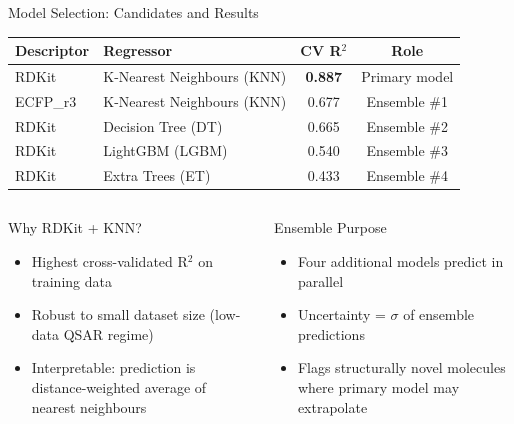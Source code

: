 \documentclass[aspectratio=169]{beamer}
\begin{document}
\begin{frame}{Model Selection: Candidates and Results}
  \centering
  \small
  \begin{tabular}{llcc}
    \toprule
    \textbf{Descriptor} & \textbf{Regressor} & \textbf{CV R$^2$} & \textbf{Role} \\
    \midrule
    \rowcolor{lightgreen}
    RDKit              & K-Nearest Neighbours (KNN)   & \textbf{0.887} & Primary model \\
    ECFP\_r3           & K-Nearest Neighbours (KNN)   & 0.677          & Ensemble \#1 \\
    RDKit              & Decision Tree (DT)           & 0.665          & Ensemble \#2 \\
    RDKit              & LightGBM (LGBM)              & 0.540          & Ensemble \#3 \\
    RDKit              & Extra Trees (ET)             & 0.433          & Ensemble \#4 \\
    \bottomrule
  \end{tabular}
  \vspace{0.8em}

  \begin{columns}
    \begin{block}{Why RDKit + KNN?}
      \small
      \begin{itemize}
        \item Highest cross-validated R$^2$ on training data
        \item Robust to small dataset size (low-data QSAR regime)
        \item Interpretable: prediction is distance-weighted average of nearest neighbours
      \end{itemize}
    \end{block}
    \begin{block}{Ensemble Purpose}
      \small
      \begin{itemize}
        \item Four additional models predict in parallel
        \item Uncertainty = $\sigma$ of ensemble predictions
        \item Flags structurally novel molecules where primary model may extrapolate
      \end{itemize}
    \end{block}
  \end{columns}
\end{frame}
\end{document}
